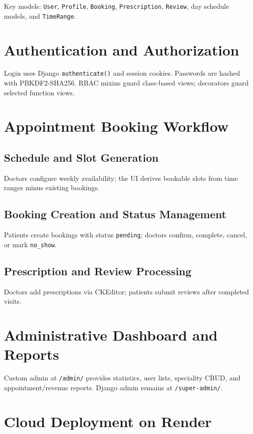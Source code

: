 Key models: \texttt{User}, \texttt{Profile}, \texttt{Booking}, \texttt{Prescription}, \texttt{Review}, day schedule models, and \texttt{TimeRange}.

\section{Authentication and Authorization}

Login uses Django \texttt{authenticate()} and session cookies. Passwords are hashed with PBKDF2-SHA256. RBAC mixins guard class-based views; decorators guard selected function views.

\section{Appointment Booking Workflow}

\subsection{Schedule and Slot Generation}
Doctors configure weekly availability; the UI derives bookable slots from time ranges minus existing bookings.

\subsection{Booking Creation and Status Management}
Patients create bookings with status \texttt{pending}; doctors confirm, complete, cancel, or mark \texttt{no\_show}.

\subsection{Prescription and Review Processing}
Doctors add prescriptions via CKEditor; patients submit reviews after completed visits.

\section{Administrative Dashboard and Reports}

Custom admin at \texttt{/admin/} provides statistics, user lists, speciality CRUD, and appointment/revenue reports. Django admin remains at \texttt{/super-admin/}.

\section{Cloud Deployment on Render}

